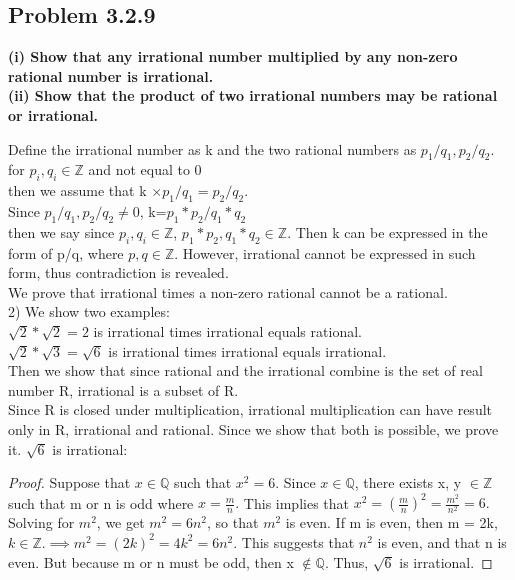 \documentclass[12pt]{article}
\theoremstyle{definition}
\numberwithin{equation}{subsection}
\begin{document}
\subsection{Problem 3.2.9}
\textbf{(i) Show that any irrational number multiplied by any non-zero rational number is irrational. \\ (ii) Show that the product of two irrational numbers may be rational or irrational.}

Define the irrational number as k and the two rational numbers as $p_1/q_1, p_2/q_2$. for $p_i,q_i\in {\mathbb Z}$ and not equal to 0 
\\ then we assume that k $\times p_1/q_1=p_2/q_2$.
\\Since $p_1/q_1, p_2/q_2\neq 0$, k=$p_1*p_2/q_1*q_2$
\\then we say since $p_i,q_i\in {\mathbb Z}$, $p_1*p_2,  q_1*q_2\in {\mathbb Z}$. Then k can be expressed in the form of p/q, where $p,q\in {\mathbb Z}$. However, irrational cannot be expressed in such form, thus contradiction is revealed. 
\\We prove that irrational times a non-zero rational cannot be a rational.
\\
2) We show two examples:
\\ $\sqrt{2}*\sqrt{2}=2$ is irrational times irrational equals rational.
\\ $\sqrt{2}*\sqrt{3}=\sqrt{6}$ is irrational  times irrational equals irrational.
\\Then we show that since rational and the irrational combine is the set of real number R, irrational is a subset of R. 
\\Since R is closed under multiplication, irrational multiplication can have result only in R, irrational and rational. Since we show that both is possible, we prove it. 
$\sqrt{6}$ is irrational:
\begin{proof}
Suppose that $x \in \mathbb{Q}$ such that $x^{2} = 6$. Since $x \in \mathbb{Q}$, there exists x, y $\in \mathbb{Z}$ such that m or n is odd where $x = \frac{m}{n}.$ This implies that $x^{2} = (\frac{m}{n})^{2} = \frac{m^{2}}{n^{2}} = 6.$
\\
Solving for $m^{2}$, we get $m^{2} = 6n^{2}$, so that $m^{2}$ is even. If m is even, then m = 2k, $k \in \mathbb{Z}. \implies m^{2} = (2k)^{2} = 4k^{2} = 6n^{2}$. This suggests that $n^{2}$ is even, and that n is even. But because m or n must be odd, then x $\notin \mathbb{Q}$. Thus, $\sqrt{6}$ is irrational.
\end{proof}
\end{document}

